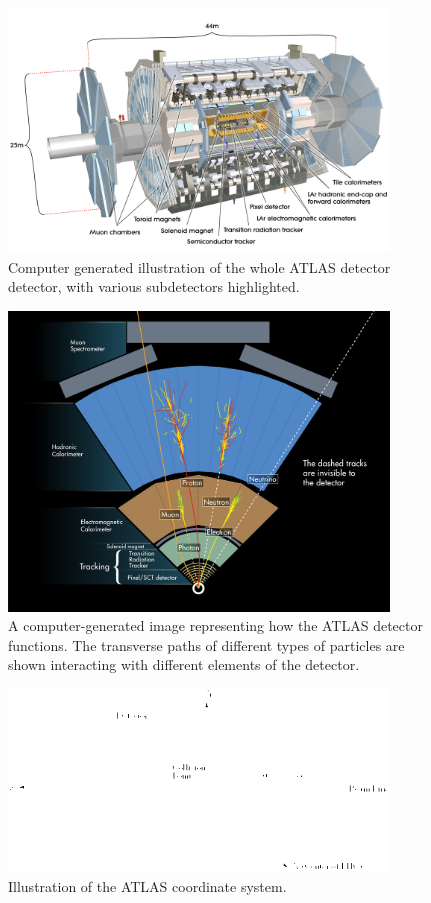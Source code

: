 \begin{figure}[tp]
  \centering
  \includegraphics[width=0.90\textwidth]{fig/atlas/atlaspic.jpg}
  \caption{Computer generated illustration of the whole ATLAS detector detector, with various subdetectors highlighted\cite{Pequenao:1095924}.}
  \label{fig:atlas-cgi}
\end{figure}

\begin{figure}[tp]
  \centering
  \includegraphics[width=0.90\textwidth]{fig/atlas/atlas-wedge.jpg}
  \caption{A computer-generated image representing how the ATLAS detector functions. The transverse paths of different types of particles are shown interacting with different elements of the detector\cite{atlas-wedge}.}
  \label{fig:atlas-wedge}
\end{figure}
\begin{figure}[tp]
  \centering
  \includegraphics[width=0.90\textwidth]{fig/atlas/coord}
  \caption{Illustration of the ATLAS coordinate system\cite{Schott:2014sea}.}
  \label{fig:atlas-coord}
\end{figure}

